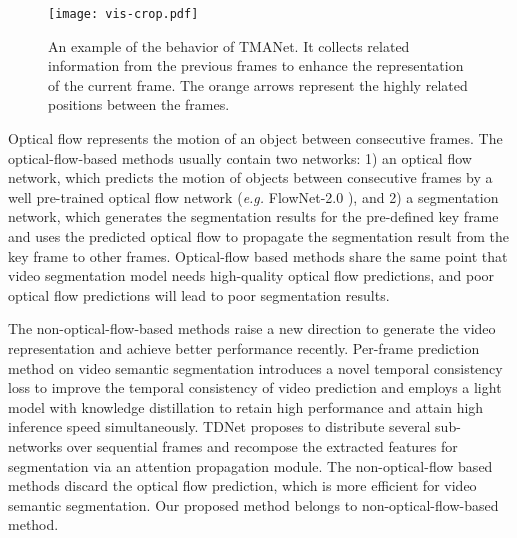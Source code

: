 \documentclass{article}
\begin{document}
	\begin{figure}[thb!]
		\begin{center}
			\texttt{[image: vis-crop.pdf]}
		\end{center}
		\vspace{-0.5cm}
		\caption{An example of the behavior of TMANet. It collects related information from the previous frames to enhance the representation of the current frame. The orange arrows represent the highly related positions between the frames.}
		\vspace{-0.5cm}
		\label{example}
	\end{figure}
	
Optical flow represents the motion of an object between consecutive frames. The optical-flow-based methods \cite{CLK2016, DFF2017, GRFP2018, LVS2018} usually contain two networks: 1) an optical flow network, which predicts the motion of objects between consecutive frames by a well pre-trained optical flow network (\emph{e.g.} FlowNet-2.0 \cite{FlowNet2.02017}), and 2) a segmentation network, which generates the segmentation results for the pre-defined key frame and  uses the predicted optical flow to propagate the segmentation result from the key frame to other frames.
Optical-flow based methods share the same point that video segmentation model needs high-quality optical flow predictions, and poor optical flow predictions will lead to poor segmentation results.
	
The non-optical-flow-based methods raise a new direction to generate the video representation and achieve better performance recently. 
Per-frame prediction method \cite{efficient2020} on video semantic segmentation introduces a novel temporal consistency loss to improve the temporal consistency of video prediction and employs a light model with knowledge distillation to retain high performance and attain high inference speed simultaneously. 
	TDNet \cite{TDNet2019} proposes to distribute several sub-networks over sequential frames and recompose the extracted features for segmentation via an attention propagation module.
	The non-optical-flow based methods discard the optical flow prediction, which is more efficient for video semantic segmentation. 
	Our proposed method  belongs to non-optical-flow-based method.
	
\end{document}
